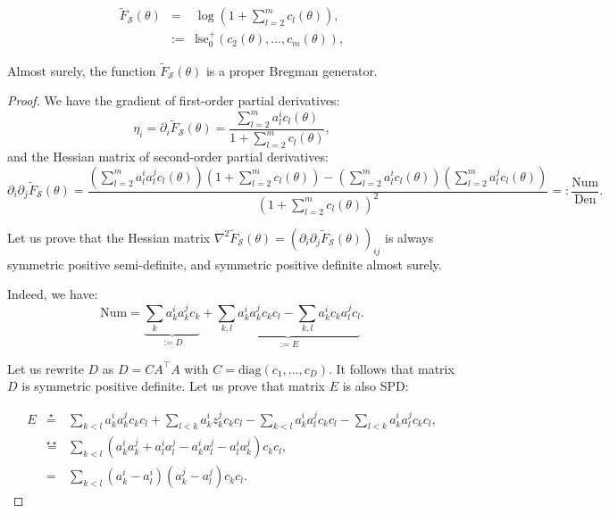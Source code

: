 \documentclass[graybox]{svmult}
\def\lse{\mathrm{lse}}
\def\diag{\mathrm{diag}}
\def\Num{\mathrm{Num}}
\def\Den{\mathrm{Den}}
\def\defeq{{=:}}
\def\eqdef{:=}
\def\tildeF{\tilde{F}}
\def\calS{\mathcal{S}}
\begin{document}
\begin{eqnarray}
\tildeF_\calS(\theta) &=& \log \left(1+ \sum_{l=2}^m c_l(\theta)\right),\\
&\eqdef & \lse_0^+(c_2(\theta), \ldots, c_m(\theta)),\label{eq:mnvgexpf}
\end{eqnarray}



\begin{theorem}\label{thm:MCEF}
Almost surely, the function $\tildeF_\calS(\theta)$ is a proper Bregman generator.
\end{theorem}


\begin{proof}
We have the gradient of first-order partial derivatives:
\begin{equation}\label{eq:gradef}
\eta_i = \partial_i \tildeF_\calS(\theta)  = \frac{ \sum_{l=2}^m a_l^i  c_l(\theta)}{1+ \sum_{l=2}^m c_l(\theta)},
\end{equation}
and the Hessian matrix of second-order partial derivatives:
\begin{equation}\label{eq:hessef}
\partial_i \partial_j\tildeF_\calS(\theta)  = \frac{
(\sum_{l=2}^m a_l^i a_l^j c_l(\theta))(1+ \sum_{l=2}^m c_l(\theta))-
 (\sum_{l=2}^m a_l^i c_l(\theta)) ( \sum_{l=2}^m a_l^j c_l(\theta))
}{(1+ \sum_{l=2}^m c_l(\theta))^2}  \defeq \frac{\Num}{\Den}.
\end{equation}

Let us prove that the Hessian matrix $\nabla^2
\tildeF_\calS(\theta)=(\partial_i
\partial_j\tildeF_\calS(\theta))_{ij}$  is always symmetric positive
semi-definite, and symmetric positive definite almost surely.

Indeed, we have:
\begin{equation}
\Num = \underbrace{\sum_k a_k^ia_k^jc_k}_{\eqdef D} + \underbrace{\sum_{k,l} a_k^ia_k^jc_kc_l-\sum_{k,l}a_k^ic_ka_l^jc_l}_{\eqdef E}.
\end{equation}

Let us rewrite $D$ as $D=C A^\top A$ with $C=\diag(c_1,\ldots, c_D)$. It follows that matrix $D$ is symmetric positive definite.
Let us prove that matrix $E$ is also SPD:

\begin{eqnarray}
E &\stackrel{\star}{=}& \sum_{k<l} a_k^ia_k^jc_k c_l + \sum_{l<k} a_k^i z_k^j c_k c_l - \sum_{k<l} a_k^i a_l^j c_k c_l - \sum_{l<k} a_k^i a_l^j c_k c_l,\label{eq:p1}\\
&\stackrel{\star\star}{=}& \sum_{k<l}\left(a_k^i a_k^j+a_l^i a_l^j-a_k^ia_l^j-a_l^ia_k^j\right)c_kc_l,\\
&=&  \sum_{k<l} (a_k^i-a_l^i) (a_k^j-a_l^j) c_kc_l.\label{eq:p2}
\end{eqnarray}


\end{proof}
\end{document}
